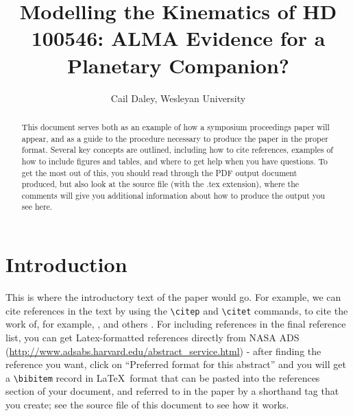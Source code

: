 \documentclass{knac}
\begin{document}
\title{Modelling the Kinematics of HD 100546: ALMA Evidence for a Planetary Companion?}


\author{Cail Daley, Wesleyan University}



\begin{abstract}

  This document serves both as an example of how a symposium
  proceedings paper will appear, and as a guide to the procedure
  necessary to produce the paper in the proper format. Several key
  concepts are outlined, including how to cite references, examples of
  how to include figures and tables, and where to get help when you
  have questions.  To get the most out of this, you should read
  through the PDF output document produced, but also look at the
  source file (with the .tex extension), where the comments will give
  you additional information about how to produce the output you see
  here.

\end{abstract}


\section{Introduction}

This is where the introductory text of the paper would go.  For
example, we can cite references in the text by using the \verb|\citep|
and \verb|\citet| commands, to cite the work of, for example,
\citet{Bary2002}, and others \citep{Kwitter2013, Willman2012}.  For
including references in the final reference list, you can get
Latex-formatted references directly from NASA ADS
(\url{http://www.adsabs.harvard.edu/abstract_service.html}) - after
finding the reference you want, click on ``Preferred format for this
abstract'' and you will get a \verb|\bibitem| record in \LaTeX\ format
that can be pasted into the references section of your document, and
referred to in the paper by a shorthand tag that you create; see the
source file of this document to see how it works.
\end{document}

